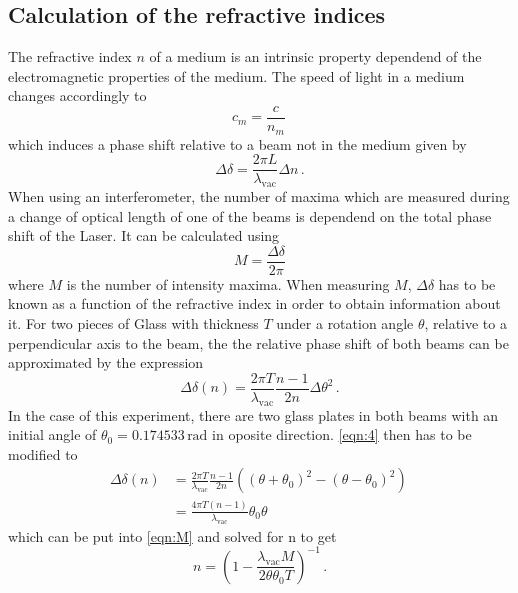 \subsection{Calculation of the refractive indices}
The refractive index $n$ of a medium is an intrinsic property dependend of the electromagnetic properties of the medium. The speed of light in a medium changes accordingly to 
\begin{equation}
    c_m = \frac{c}{n_m} \, 
\end{equation}
which induces a phase shift relative to a beam not in the medium given by 
\begin{equation}
    \label{eqn:deldel}
    \Delta \delta = \frac{2\pi L}{\lambda_{\text{vac}}} \Delta n \, .
\end{equation}
When using an interferometer, the number of maxima which are measured during a change of optical length of one of the beams is dependend on the total phase shift of the Laser.
It can be calculated using 
\begin{equation}
    \label{eqn:M}
    M = \frac{\Delta \delta}{2 \pi}
\end{equation}
where $M$ is the number of intensity maxima.
When measuring $M$, $\Delta \delta$ has to be known as a function of the refractive index in order to obtain information about it. For two pieces of Glass with thickness $T$ under a rotation angle $\theta$, relative to a perpendicular axis to the beam, the the relative phase shift of both beams can be approximated by the expression
\begin{equation}
    \label{eqn:4}
    \Delta \delta \left( n \right) = \frac{2 \pi T}{\lambda_\text{vac}}  \frac{n-1}{2n}\Delta \theta^2 \, .
\end{equation}
In the case of this experiment, there are two glass plates in both beams with an initial angle of $\theta_0 = 0.174533 \, \text{rad}$ in oposite direction. 
\autoref{eqn:4} then has to be modified to 
\begin{equation}
    \begin{aligned}
    \label{eqn:5}
    \Delta \delta \left( n \right) &= \frac{2 \pi T}{\lambda_\text{vac}}  \frac{n-1}{2n} \left( \left(\theta + \theta_0\right)^2 - \left(\theta - \theta_0\right)^2 \right) \, \\
    &= \frac{4 \pi T \left(n-1\right)}{\lambda_\text{vac}} \theta_0 \theta
    \end{aligned}
\end{equation}
which can be put into \autoref{eqn:M} and solved for n to get 
\begin{equation}
    n = \left( 1 - \frac{\lambda_\text{vac} M }{2 \theta \theta_0 T} \right)^{-1} \, .
\end{equation}
